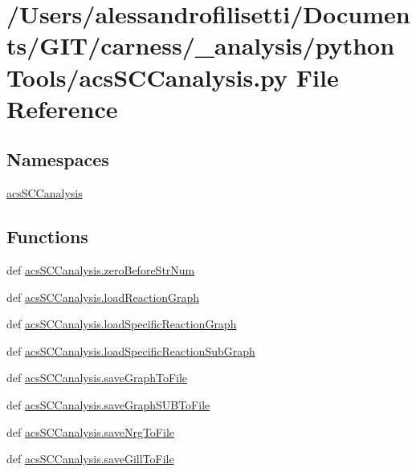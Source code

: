 \hypertarget{a00045}{\section{/\+Users/alessandrofilisetti/\+Documents/\+G\+I\+T/carness/\+\_\+analysis/python\+Tools/acs\+S\+C\+Canalysis.py File Reference}
\label{a00045}
}
\subsection*{Namespaces}
\begin{DoxyCompactItemize}
\item 
 \hyperlink{a00130}{acs\+S\+C\+Canalysis}
\end{DoxyCompactItemize}
\subsection*{Functions}
\begin{DoxyCompactItemize}
\item 
def \hyperlink{a00130_ab46df2a2027edcf1b07fc012b691b9d6}{acs\+S\+C\+Canalysis.\+zero\+Before\+Str\+Num}
\item 
def \hyperlink{a00130_a4c179674ced261fa5a003a679647d7f3}{acs\+S\+C\+Canalysis.\+load\+Reaction\+Graph}
\item 
def \hyperlink{a00130_a7517a12f1c90a0ae0e997161079676bd}{acs\+S\+C\+Canalysis.\+load\+Specific\+Reaction\+Graph}
\item 
def \hyperlink{a00130_ab9d3c9c8514469b4dea42d8caacb3937}{acs\+S\+C\+Canalysis.\+load\+Specific\+Reaction\+Sub\+Graph}
\item 
def \hyperlink{a00130_abf8df0ca8eb1c3ae9aeb0b20813d93d2}{acs\+S\+C\+Canalysis.\+save\+Graph\+To\+File}
\item 
def \hyperlink{a00130_a5c959ea7dd3d2bd42004f1e5fd41f249}{acs\+S\+C\+Canalysis.\+save\+Graph\+S\+U\+B\+To\+File}
\item 
def \hyperlink{a00130_a541e9f38936fdf58fde0869521fdc5fc}{acs\+S\+C\+Canalysis.\+save\+Nrg\+To\+File}
\item 
def \hyperlink{a00130_ae6d4582e548a062fb38bf6aaa62e1558}{acs\+S\+C\+Canalysis.\+save\+Gill\+To\+File}
\end{DoxyCompactItemize}
